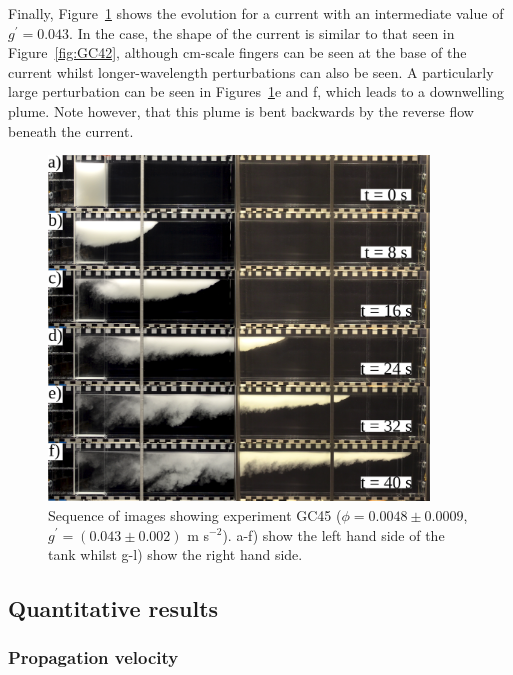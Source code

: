 \documentclass[authoryear,preprint,review,12pt]{elsarticle}
\begin{document}
Finally, Figure~\ref{fig:GC45} shows the evolution for a current with an intermediate value of $g^{\prime} = 0.043$. In the case, the shape of the current is similar to that seen in Figure~\ref{fig:GC42}, although cm-scale fingers can be seen at the base of the current whilst longer-wavelength perturbations can also be seen. A particularly large perturbation can be seen in Figures~\ref{fig:GC45}e and f, which leads to a downwelling plume. Note however, that this plume is bent backwards by the reverse flow beneath the current. 
\begin{figure}[ht!]
  \centerline{\includegraphics[width=0.9\textwidth]{GC45.png}}
  \caption{Sequence of images showing experiment GC45 ($\phi = 0.0048 \pm 0.0009$, $g^{\prime} = (0.043 \pm 0.002)$ m s$^{-2}$). a-f) show the left hand side of the tank whilst g-l) show the right hand side.}
  \label{fig:GC45}
\end{figure}

\subsection{Quantitative results}
\label{subsec:quant}

\subsubsection{Propagation velocity}
\end{document}

